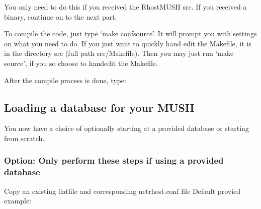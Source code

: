 \documentclass[letterpaper,10pt,english]{sphinxmanual}
\begin{document}
\sphinxAtStartPar
You only need to do this if you received the RhostMUSH src.  If you received a binary, continue on to the next part.

\sphinxAtStartPar
To compile the code, just type ‘make confsource’.  It will prompt you with settings on what you need to do.  If you just want to quickly hand edit the Makefile, it is in the directory src (full path src/Makefile).  Then you may just run ‘make source’, if you so choose to hand\sphinxhyphen{}edit the Makefile.

\sphinxAtStartPar
After the compile process is done, type:

\begin{sphinxVerbatim}[commandchars=\\\{\}]
 
\end{sphinxVerbatim}


\subsection{Loading a database for your MUSH}
\label{\detokenize{install:loading-a-database-for-your-mush}}
\sphinxAtStartPar
You now have a choice of optionally starting at a provided database or starting from scratch.


\subsubsection{Option: Only perform these steps if using a provided database}
\label{\detokenize{install:option-only-perform-these-steps-if-using-a-provided-database}}
\sphinxAtStartPar
Copy an existing flatfile and corresponding netrhost.conf file Default provied example:

\begin{sphinxVerbatim}[commandchars=\\\{\}]
  
   
 
   
\end{sphinxVerbatim}
\end{document}
